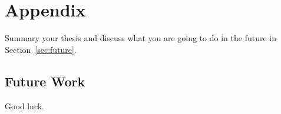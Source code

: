 \chapter{Appendix}
\label{cha:concee}
Summary your thesis and discuss what you are going to do in the future in Section~\ref{sec:future}.


\section{Future Work}
\label{sec:futurewefw}
Good luck.